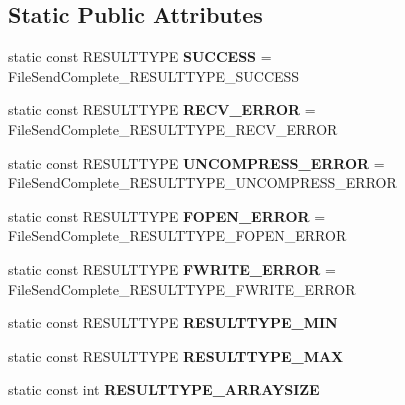 \subsection*{Static Public Attributes}
\begin{DoxyCompactItemize}
\item 
\mbox{\label{classruntime_1_1FileSendComplete_a54c70e3ac3ad888719aa37b0a328bf6d}} 
static const R\+E\+S\+U\+L\+T\+T\+Y\+PE {\bfseries S\+U\+C\+C\+E\+SS} = File\+Send\+Complete\+\_\+\+R\+E\+S\+U\+L\+T\+T\+Y\+P\+E\+\_\+\+S\+U\+C\+C\+E\+SS
\item 
\mbox{\label{classruntime_1_1FileSendComplete_a76c26f835d94a6ad769796a437e86bf3}} 
static const R\+E\+S\+U\+L\+T\+T\+Y\+PE {\bfseries R\+E\+C\+V\+\_\+\+E\+R\+R\+OR} = File\+Send\+Complete\+\_\+\+R\+E\+S\+U\+L\+T\+T\+Y\+P\+E\+\_\+\+R\+E\+C\+V\+\_\+\+E\+R\+R\+OR
\item 
\mbox{\label{classruntime_1_1FileSendComplete_acbc22687689491a4ebf36323290798b4}} 
static const R\+E\+S\+U\+L\+T\+T\+Y\+PE {\bfseries U\+N\+C\+O\+M\+P\+R\+E\+S\+S\+\_\+\+E\+R\+R\+OR} = File\+Send\+Complete\+\_\+\+R\+E\+S\+U\+L\+T\+T\+Y\+P\+E\+\_\+\+U\+N\+C\+O\+M\+P\+R\+E\+S\+S\+\_\+\+E\+R\+R\+OR
\item 
\mbox{\label{classruntime_1_1FileSendComplete_aff506626f51ff43a52a6c879adfc43c7}} 
static const R\+E\+S\+U\+L\+T\+T\+Y\+PE {\bfseries F\+O\+P\+E\+N\+\_\+\+E\+R\+R\+OR} = File\+Send\+Complete\+\_\+\+R\+E\+S\+U\+L\+T\+T\+Y\+P\+E\+\_\+\+F\+O\+P\+E\+N\+\_\+\+E\+R\+R\+OR
\item 
\mbox{\label{classruntime_1_1FileSendComplete_af117de5bda522e22f59c1a93d36d6bec}} 
static const R\+E\+S\+U\+L\+T\+T\+Y\+PE {\bfseries F\+W\+R\+I\+T\+E\+\_\+\+E\+R\+R\+OR} = File\+Send\+Complete\+\_\+\+R\+E\+S\+U\+L\+T\+T\+Y\+P\+E\+\_\+\+F\+W\+R\+I\+T\+E\+\_\+\+E\+R\+R\+OR
\item 
static const R\+E\+S\+U\+L\+T\+T\+Y\+PE {\bfseries R\+E\+S\+U\+L\+T\+T\+Y\+P\+E\+\_\+\+M\+IN}
\item 
static const R\+E\+S\+U\+L\+T\+T\+Y\+PE {\bfseries R\+E\+S\+U\+L\+T\+T\+Y\+P\+E\+\_\+\+M\+AX}
\item 
static const int {\bfseries R\+E\+S\+U\+L\+T\+T\+Y\+P\+E\+\_\+\+A\+R\+R\+A\+Y\+S\+I\+ZE}

\end{DoxyCompactItemize}
